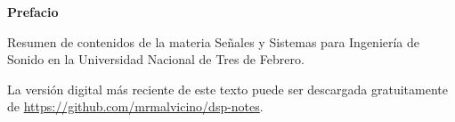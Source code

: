 \clearpage
\noindent
\textbf{Prefacio}

Resumen de contenidos de la materia Señales y Sistemas para Ingeniería de Sonido en la Universidad Nacional de Tres de Febrero.

La versión digital más reciente de este texto puede ser descargada gratuitamente de \url{https://github.com/mrmalvicino/dsp-notes}.